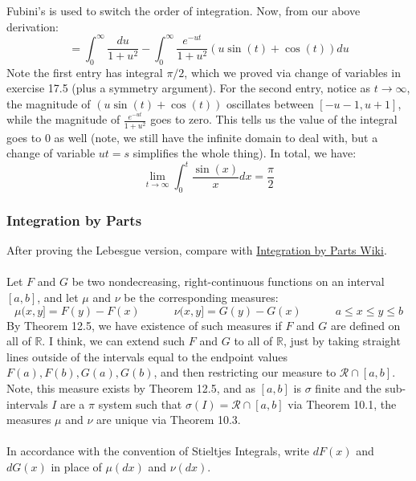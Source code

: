 \documentclass[12pt,a4paper]{article}
\newcommand{\1}[1]{\mathbbm{1}\left\{ #1 \right\}}
\newcommand{\R}{\mathbb{R}}
\newcommand{\rcal}{\mathcal{R}}
\begin{document}
Fubini's is used to switch the order of integration. Now, from our above derivation:
$$
	= \int_0^\infty \frac{du}{1 + u^2} - \int_0^\infty \frac{e^{-ut}}{1+u^2}(u\sin(t) + \cos(t)) du
$$
Note the first entry has integral $\pi/2$, which we proved via change of variables in exercise 17.5 (plus a symmetry argument). For the second entry, notice as $t \to \infty$, the magnitude of $(u \sin(t) + \cos(t))$ oscillates between $[-u-1, u+1]$, while the magnitude of $\frac{e^{-ut}}{1+u^2}$ goes to zero. This tells us the value of the integral goes to 0 as well (note, we still have the infinite domain to deal with, but a change of variable $ut = s$ simplifies the whole thing). In total, we have:
$$
	\lim_{t \to \infty} \int_0^t \frac{\sin(x)}{x} dx = \frac{\pi}{2}
$$

\subsubsection{Integration by Parts} After proving the Lebesgue version, compare with \href{https://en.wikipedia.org/wiki/Integration_by_parts}{Integration by Parts Wiki}.
\\\\
Let $F$ and $G$ be two nondecreasing, right-continuous functions on an interval $[a,b]$, and let $\mu$ and $\nu$ be the corresponding measures:
$$
	\mu(x,y] = F(y) - F(x)
	\quad\quad\quad
	\nu(x,y] = G(y) - G(x)
	\quad\quad\quad
	a \leq x \leq y \leq b
$$
By Theorem 12.5, we have existence of such measures if $F$ and $G$ are defined on all of $\R$. I think, we can extend such $F$ and $G$ to all of $\R$, just by taking straight lines outside of the intervals equal to the endpoint values $F(a), F(b), G(a), G(b)$, and then restricting our measure to $\rcal \cap [a,b]$. Note, this measure exists by Theorem 12.5, and as $[a,b]$ is $\sigma$ finite and the sub-intervals $I$ are a $\pi$ system such that $\sigma(I) = \rcal \cap [a,b]$ via Theorem 10.1, the measures $\mu$ and $\nu$ are unique via Theorem 10.3.
\\\\
In accordance with the convention of Stieltjes Integrals, write $dF(x)$ and $dG(x)$ in place of $\mu(dx)$ and $\nu(dx)$.
\end{document}

